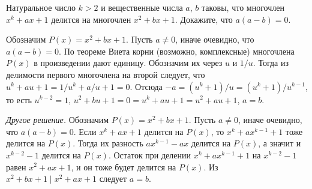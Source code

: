 \problem
Натуральное число $k > 2$ и вещественные числа $a$, $b$ таковы, что
многочлен $x^k + a x + 1$ делится на многочлен $x^2 + b x + 1$.
Докажите, что $a (a - b) = 0$.

\solution
Обозначим $P(x) = x^2 + b x + 1$.
Пусть $a \neq 0$, иначе очевидно, что $a (a - b) = 0$.
По теореме Виета корни (возможно, комплексные) многочлена $P(x)$ в произведении
дают единицу.
Обозначим их через $u$ и $1 / u$.
Тогда из делимости первого многочлена на второй следует, что
$u^k + a u + 1 = 1 / u^k + a / u + 1 = 0$.
Отсюда
$-a = (u^k + 1) / u = (u^k + 1) / u^{k - 1}$,
то есть $u^{k - 2} = 1$,
$u^2 + b u + 1 = 0 = u^k + a u + 1 = u^2 + a u + 1$, $a = b$.
\par
\emph{Другое решение.}
Обозначим $P(x) = x^2 + b x + 1$.
Пусть $a \neq 0$, иначе очевидно, что $a (a - b) = 0$.
Если $x^k + a x + 1$ делится на $P(x)$, то $x^k + a x^{k - 1} + 1$ тоже делится
на $P(x)$.
Тогда их разность $a x^{k - 1} - a x$ делится на $P(x)$, а значит и
$x^{k - 2} - 1$ делится на $P(x)$.
Остаток при делении $x^k + a x^{k - 1} + 1$ на $x^{k - 2} - 1$ равен
$x^2 + a x + 1$, и он тоже будет делится на $P(x)$.
Из $x^2 + b x + 1 \mid x^2 + a x + 1$ следует $a = b$.

\endproblem
